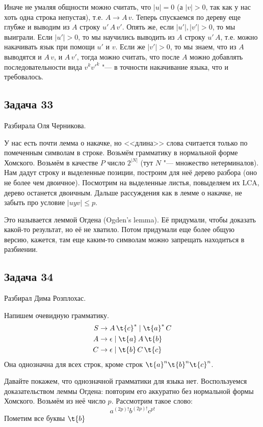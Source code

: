 		Иначе не умаляя общности можно считать, что $|u|=0$ (а $|v|>0$, так как у нас хоть одна
		строка непустая), т.е. $A \to A\, v$.
		Теперь спускаемся по дереву еще глубже и выводим из $A$ строку $u'\,A\,v'$.
		Опять же, если $|u'|, |v'|>0$, то мы выиграли.
		Если $|u'|>0$, то мы научились выводить из $A$ строку $u'\,A$,
		т.е. можно накачивать язык при помощи $u'$ и $v$.
		Если же $|v'|>0$, то мы знаем, что из $A$ выводятся и $A\,v$, и $A\,v'$,
		тогда можно считать, что после $A$ можно добавлять последовательности вида
		$v^k{v'}^k$ "--- в точности накачивание языка, что и требовалось.

\subsection{Задача 33}
	\TODO
	Разбирала Оля Черникова.

	У нас есть почти лемма о накачке, но <<длина>> слова считается только по помеченным символам в строке.
	Возьмём грамматику в нормальной форме Хомского.
	Возьмём в качестве $P$ число $2^{|N|}$ (тут $N$ "--- множество нетерминалов).
	Нам дадут строку и выделенные позиции, построим для неё дерево разбора (оно не более чем двоичное).
	Посмотрим на выделенные листья, повыделяем их LCA, дерево останется двоичным.
	\TODO Дальше рассуждения как в лемме о накачке, не забыть про условие $|uyv|\le p$.

	\begin{Rem}
		Это называется леммой Огдена (Ogden's lemma).
		Её придумали, чтобы доказать какой-то результат, но её не хватило.
		Потом придумали еще более общую версию, кажется, там еще каким-то символам можно запрещать находиться в разбиении.
	\end{Rem}

\subsection{Задача 34}
	\TODO
	Разбирал Дима Розплохас.

	Напишем очевидную грамматику.
	\begin{align*}
		S &\to A\,\t{c}^{*} \mid \t{a}^{*}\,C \\
		A &\to \epsilon \mid \t{a}\,A\,\t{b} \\
		C &\to \epsilon \mid \t{b}\,C\,\t{c} \\
	\end{align*}
	Она однозначна для всех строк, кроме строк $\t{a}^n\t{b}^n\t{c}^n$.

	Давайте покажем, что однозначной грамматики для языка нет.
	Воспользуемся доказательством леммы Огдена: повторим его аккуратно без нормальной формы Хомского.
	Возьмём из неё число $p$.
	Рассмотрим такое слово:
	\[ a^{(2p)!}b^{(2p)!}c^{p!} \]
	Пометим все буквы $\t{b}$
	\TODO
